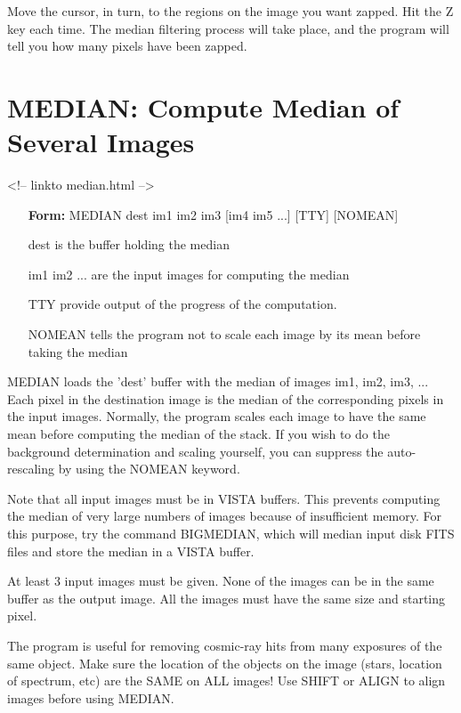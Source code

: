 Move the cursor, in turn, to the regions on the image you want zapped.  Hit
the Z key each time.  The median filtering process will take place, and the
program will tell you how many pixels have been zapped.

\section{MEDIAN: Compute Median of Several Images}
\begin{rawhtml}
<!-- linkto median.html -->
\end{rawhtml}

\begin{itemize}
  \item[\textbf{Form: }MEDIAN dest im1 im2 im3 {[im4 im5 ...]} {[TTY]} 
       {[NOMEAN]}\hfill]{}
  \item[dest]{is the buffer holding the median}
  \item[im1 im2 ...]{are the input images for computing the median}
  \item[TTY]{provide output of the progress of the computation.}
  \item[NOMEAN]{tells the program not to scale each image by
       its mean before taking the median}
\end{itemize}

MEDIAN loads the 'dest' buffer with the median of images im1, im2, im3, ...
Each pixel in the destination image is the median of the corresponding
pixels in the input images. Normally, the program scales each image to have
the same mean before computing the median of the stack. If you wish to do
the background determination and scaling yourself, you can suppress the
auto-rescaling by using the NOMEAN keyword.

Note that all input images must be in VISTA buffers. This prevents
computing the median of very large numbers of images because of insufficient memory.  For
this purpose, try the command BIGMEDIAN, which will median input disk FITS
files and store the median in a VISTA buffer.

At least 3 input images must be given.  None of the images can be in the
same buffer as the output image.  All the images must have the same size
and starting pixel.

The program is useful for removing cosmic-ray hits from many exposures of
the same object.  Make sure the location of the objects on the image
(stars, location of spectrum, etc) are the SAME on ALL images!  Use SHIFT
or ALIGN to align images before using MEDIAN.

